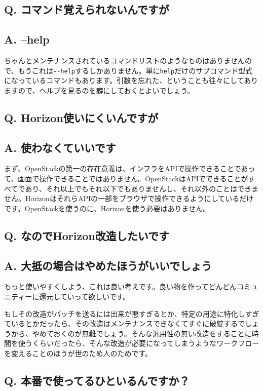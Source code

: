 \documentclass[9pt,b5paper,tombo,openany]{jsbook}
\begin{document}
\subsection*{{\bfseries Q.} コマンド覚えられないんですが}
\subsection*{{\bfseries A.} --help}
ちゃんとメンテナンスされているコマンドリストのようなものはありませんので、もうこれは\verb|--help|するしかありません。単に\verb|help|だけのサブコマンド型式になっているコマンドもあります。引数を忘れた、ということも往々にしてありますので、ヘルプを見るのを癖にしておくとよいでしょう。

\subsection*{{\bfseries Q.} Horizon使いにくいんですが}
\subsection*{{\bfseries A.} 使わなくていいです}
まず、OpenStackの第一の存在意義は、インフラをAPIで操作できることであって、画面で操作できることではありません。OpenStackはAPIでできることがすべてであり、それ以上でもそれ以下でもありませんし、それ以外のことはできません。HorizonはそれらAPIの一部をブラウザで操作できるようにしているだけです。OpenStackを使うのに、Horizonを使う必要はありません。

\subsection*{{\bfseries Q.} なのでHorizon改造したいです}
\subsection*{{\bfseries A.} 大抵の場合はやめたほうがいいでしょう}
もっと使いやすくしよう、これは良い考えです。良い物を作ってどんどんコミュニティーに還元していって欲しいです。

もしその改造がパッチを送るには出来が悪すぎるとか、特定の用途に特化しすぎているとかだったら、その改造はメンテナンスできなくてすぐに破綻するでしょうから、やめておくのが無難でしょう。そんな汎用性の無い改造をすることに時間を使うくらいだったら、そんな改造が必要になってしまうようなワークフローを変えることのほうが世のため人のためです。

\subsection*{{\bfseries Q.} 本番で使ってるひといるんですか？}
\end{document}
